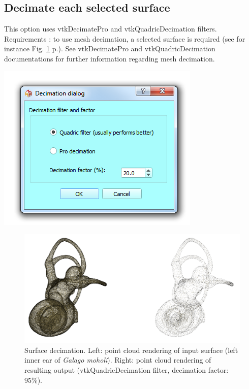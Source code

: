 \subsection{Decimate each selected surface}
\noindent
\begin{minipage}{0.5\textwidth}


This option uses vtkDecimatePro and vtkQuadricDecimation filters. Requirements : to use mesh decimation, a selected
surface is required (see for instance Fig. \ref{decimate} p.\pageref{decimate}). See vtkDecimatePro and vtkQuadricDecimation documentations for further information regarding
mesh decimation.

\end{minipage}    
\begin{minipage}{0.5\textwidth}\centering
  \includegraphics[scale=0.5]{images/09/structure/decimation_dialog.png}
 \end{minipage} 
\noindent

\begin{figure}
  \centering
  \includegraphics[scale=0.35]{images/09/structure/decimation_example.png} 
	\caption{Surface decimation. Left: point cloud rendering of input surface (left inner ear of \textit{Galago moholi}). Right: point cloud rendering of resulting output (vtkQuadricDecimation filter,
decimation factor: 95\%). 
}
\label{decimate}
 
\end{figure}

